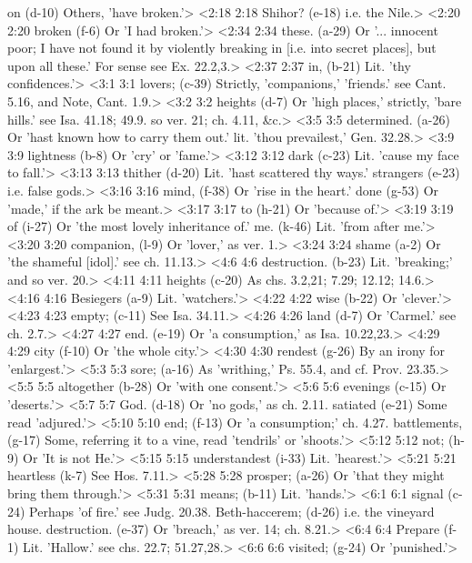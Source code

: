   on (d-10)  Others, 'have broken.'>
<2:18 2:18  Shihor? (e-18)  i.e. the Nile.>
<2:20 2:20  broken (f-6)  Or 'I had broken.'>
<2:34 2:34  these. (a-29)  Or '... innocent poor; I have not found it by violently  breaking in [i.e. into secret places], but upon all these.' For  sense see Ex. 22.2,3.>
<2:37 2:37  in, (b-21)  Lit. 'thy confidences.'>
<3:1 3:1  lovers; (c-39)  Strictly, 'companions,' 'friends.' see Cant. 5.16, and Note,  Cant. 1.9.>
<3:2 3:2  heights (d-7)  Or 'high places,' strictly, 'bare hills.' see Isa. 41.18; 49.9. so ver. 21; ch. 4.11, &c.>
<3:5 3:5  determined. (a-26)  Or 'hast known how to carry them out.' lit. 'thou  prevailest,' Gen. 32.28.>
<3:9 3:9  lightness (b-8)  Or 'cry' or 'fame.'>
<3:12 3:12  dark (c-23)  Lit. 'cause my face to fall.'>
<3:13 3:13  thither (d-20)  Lit. 'hast scattered thy ways.'
  strangers (e-23)  i.e. false gods.>
<3:16 3:16  mind, (f-38)  Or 'rise in the heart.'
  done (g-53)  Or 'made,' if the ark be meant.>
<3:17 3:17  to (h-21)  Or 'because of.'>
<3:19 3:19  of (i-27)  Or 'the most lovely inheritance of.'
 me. (k-46)  Lit. 'from after me.'>
<3:20 3:20  companion, (l-9)  Or 'lover,' as ver. 1.>
<3:24 3:24  shame (a-2)  Or 'the shameful [idol].' see ch. 11.13.>
<4:6 4:6  destruction. (b-23)  Lit. 'breaking;' and so ver. 20.>
<4:11 4:11  heights (c-20)  As chs. 3.2,21; 7.29; 12.12; 14.6.>
<4:16 4:16  Besiegers (a-9)  Lit. 'watchers.'>
<4:22 4:22  wise (b-22)  Or 'clever.'>
<4:23 4:23  empty; (c-11)  See Isa. 34.11.>
<4:26 4:26  land (d-7)  Or 'Carmel.' see ch. 2.7.>
<4:27 4:27  end. (e-19)  Or 'a consumption,' as Isa. 10.22,23.>
<4:29 4:29  city (f-10)  Or 'the whole city.'>
<4:30 4:30  rendest (g-26)  By an irony for 'enlargest.'>
<5:3 5:3  sore; (a-16)  As 'writhing,' Ps. 55.4, and cf. Prov. 23.35.>
<5:5 5:5  altogether (b-28)  Or 'with one consent.'>
<5:6 5:6  evenings (c-15)  Or 'deserts.'>
<5:7 5:7  God. (d-18)  Or 'no gods,' as ch. 2.11.
  satiated (e-21)  Some read 'adjured.'>
<5:10 5:10  end; (f-13)  Or 'a consumption;' ch. 4.27.
  battlements, (g-17)  Some, referring it to a vine, read 'tendrils' or 'shoots.'>
<5:12 5:12  not; (h-9)  Or 'It is not He.'>
<5:15 5:15  understandest (i-33)  Lit. 'hearest.'>
<5:21 5:21  heartless (k-7)  See Hos. 7.11.>
<5:28 5:28  prosper; (a-26)  Or 'that they might bring them through.'>
<5:31 5:31  means; (b-11)  Lit. 'hands.'>
<6:1 6:1  signal (c-24)  Perhaps 'of fire.' see Judg. 20.38.
  Beth-haccerem; (d-26)  i.e. the vineyard house.
  destruction. (e-37)  Or 'breach,' as ver. 14; ch. 8.21.>
<6:4 6:4  Prepare (f-1)  Lit. 'Hallow.' see chs. 22.7; 51.27,28.>
<6:6 6:6  visited; (g-24)  Or 'punished.'>
